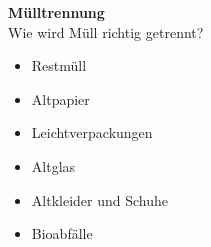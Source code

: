 \documentclass[a4paper]{article}
\begin{document}
\begin{enumerate}
\textbf{Mülltrennung}\\
Wie wird Müll richtig getrennt?
\begin{itemize}
\item Restmüll
\item Altpapier
\item Leichtverpackungen
\item Altglas
\item Altkleider und Schuhe
\item Bioabfälle
\end{itemize}



\end{enumerate}


\makeatletter
\def\footrule{{
  \vskip-\footruleskip\vskip-\footrulewidth
  \color{\footrulecolor}
  \hrule\@width\headwidth\@height
  \footrulewidth\vskip\footruleskip
}}
\makeatother
\renewcommand{\footrulewidth}{3pt}
\newcommand{\footrulecolor}{dgreen}
\end{document}
